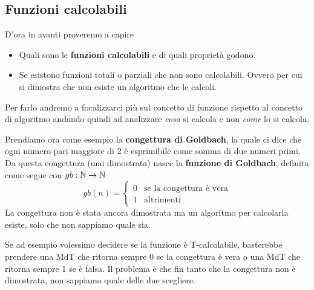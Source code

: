 \subsection{Funzioni calcolabili}
D'ora in avanti proveremo a capire
\begin{itemize}
	\item Quali sono le \textbf{funzioni calcolabili} e di
	      quali proprietà godono.
	\item Se esistono funzioni totali o parziali che non sono
	      calcolabili. Ovvero per cui si dimostra che non esiste
	      un algoritmo che le calcoli.
\end{itemize}
Per farlo andremo a focalizzarci più sul concetto di funzione
rispetto al concetto di algoritmo andando quindi ad analizzare
\emph{cosa} si calcola e non \emph{come} lo si calcola.

\begin{example}
	Prendiamo ora come esempio la
	\textbf{congettura di Goldbach}, la quale ci dice che ogni
	numero pari maggiore di 2 è esprimibile come somma di due
	numeri primi. Da questa congettura (mai dimostrata) nasce
	la \textbf{funzione di Goldbach}, definita come segue con
	$gb : \mathbb{N} \to \mathbb{N}$
	\[
		gb(n) = \begin{cases}
			0 & \text{se la congettura è vera} \\
			1 & \text{altrimenti}
		\end{cases}
	\]
	La congettura non è stata ancora dimostrata ma un algoritmo
	per calcolarla esiste, solo che non sappiamo quale sia.

	Se ad esempio volessimo decidere se la funzione è
	T-calcolabile, basterebbe prendere una MdT che ritorna
	sempre 0 se la congettura è vera o una MdT che ritorna
	sempre 1 se è falsa. Il problema è che fin tanto che la
	congettura non è dimostrata, non sappiamo quale delle due
	scegliere.
\end{example}

